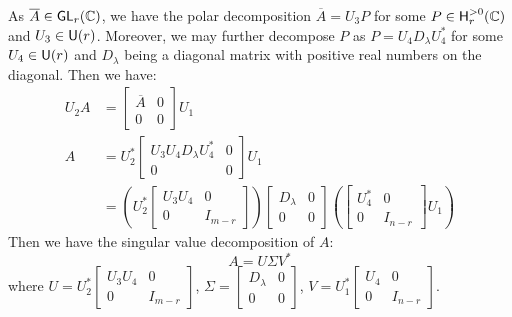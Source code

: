 As $\overline{A} \in \operatorname{\text{\normalfont\sffamily GL}}_r(\operatorname{\mathbb{C}})$, we have the polar decomposition $\overline{A} = U_3 P$ for some $P \in \text{\normalfont\sffamily H}_r^{> 0} (\operatorname{\mathbb{C}})$ and $U_3 \in \operatorname{\text{\normalfont\sffamily U}}(r)$. Moreover, we may further decompose $P$ as $P = U_4 D_\lambda U_4^*$ for some $U_4 \in \operatorname{\text{\normalfont\sffamily U}}(r)$ and $D_\lambda$ being a diagonal matrix with positive real numbers on the diagonal. Then we have:
\begin{align*}
	U_2 A & = \begin{bmatrix}
		          \overline{A} & 0 \\
		          0            & 0
	          \end{bmatrix} U_1                                                             \\
	A     & = U_2^* \begin{bmatrix}
		                U_3 U_4 D_\lambda U_4^* & 0 \\
		                0                       & 0
	                \end{bmatrix} U_1                                             \\
	      & = \left(U_2^* \begin{bmatrix}
		                      U_3 U_4 & 0       \\
		                      0       & I_{m-r}
	                      \end{bmatrix}\right) \begin{bmatrix}
		                                           D_\lambda & 0 \\
		                                           0         & 0
	                                           \end{bmatrix} \left(\begin{bmatrix}
		                                                               U_4^* & 0       \\
		                                                               0     & I_{n-r}
	                                                               \end{bmatrix} U_1\right)
\end{align*}
Then we have the singular value decomposition of $A$:
\[
	A = U \Sigma V^*
\]
where $U = U_2^* \begin{bmatrix}
		U_3 U_4 & 0       \\
		0       & I_{m-r}
	\end{bmatrix}$, \quad
$\Sigma = \begin{bmatrix}
		D_\lambda & 0 \\
		0         & 0
	\end{bmatrix}$, \quad
$V = U_1^* \begin{bmatrix}
		U_4 & 0       \\
		0   & I_{n-r}
	\end{bmatrix}$.

